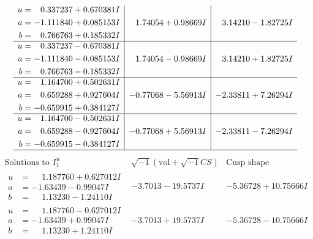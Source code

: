 \documentclass[1p]{elsarticle_modified}
\theoremstyle{definition}
\newcommand{\I}{\sqrt{-1}}
\begin{document}
$$\begin{array}{c|c|c}
\begin{aligned}
u &= \phantom{-}0.337237 + 0.670381 I \\
a &= -1.111840 + 0.085153 I \\
b &= \phantom{-}0.766763 + 0.185332 I\end{aligned}
 & \phantom{-}1.74054 + 0.98669 I & \phantom{-}3.14210 - 1.82725 I \\ \hline\begin{aligned}
u &= \phantom{-}0.337237 - 0.670381 I \\
a &= -1.111840 - 0.085153 I \\
b &= \phantom{-}0.766763 - 0.185332 I\end{aligned}
 & \phantom{-}1.74054 - 0.98669 I & \phantom{-}3.14210 + 1.82725 I \\ \hline\begin{aligned}
u &= \phantom{-}1.164700 + 0.502631 I \\
a &= \phantom{-}0.659288 + 0.927604 I \\
b &= -0.659915 + 0.384127 I\end{aligned}
 & -0.77068 - 5.56913 I & -2.33811 + 7.26294 I \\ \hline\begin{aligned}
u &= \phantom{-}1.164700 - 0.502631 I \\
a &= \phantom{-}0.659288 - 0.927604 I \\
b &= -0.659915 - 0.384127 I\end{aligned}
 & -0.77068 + 5.56913 I & -2.33811 - 7.26294 I\\
 \hline 
 \end{array}$$\newpage$$\begin{array}{c|c|c}  
\text{Solutions to }I^u_{1}& \I (\text{vol} + \sqrt{-1}CS) & \text{Cusp shape}\\
 \hline 
\begin{aligned}
u &= \phantom{-}1.187760 + 0.627012 I \\
a &= -1.63439 - 0.99047 I \\
b &= \phantom{-}1.13230 - 1.24110 I\end{aligned}
 & -3.7013 - 19.5737 I & -5.36728 + 10.75666 I \\ \hline\begin{aligned}
u &= \phantom{-}1.187760 - 0.627012 I \\
a &= -1.63439 + 0.99047 I \\
b &= \phantom{-}1.13230 + 1.24110 I\end{aligned}
 & -3.7013 + 19.5737 I & -5.36728 - 10.75666 I \\ \hline\begin{aligned}

\end{aligned}
\end{array}$$
\end{document}
